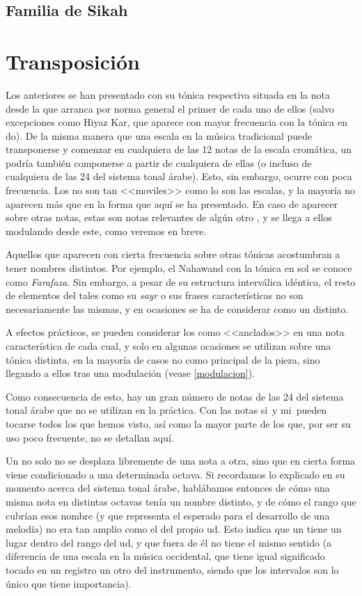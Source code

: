 \subsection{Familia de \yins Sikah}

\section{Transposición}
\label{transposicion}

Los anteriores \maqamaat se han presentado con su tónica respectiva situada en la nota desde la que arranca por norma general el primer \yins de cada uno de ellos (salvo excepciones como Hiyaz Kar, que aparece con mayor frecuencia con la tónica en do). De la misma manera que una escala en la música tradicional puede transponerse y comenzar en cualquiera de las 12 notas de la escala cromática, un \maqam podría también componerse a partir de cualquiera de ellas (o incluso de cualquiera de las 24 del sistema tonal árabe). Esto, sin embargo, ocurre con poca frecuencia. Los \maqamaat no son tan <<moviles>> como lo son las escalas, y la mayoría no aparecen más que en la forma que aquí se ha presentado. En caso de aparecer sobre otras notas, estas son notas relevantes de algún otro \maqamb, y se llega a ellos modulando desde este, como veremos en breve.

Aquellos \maqamaat que aparecen con cierta frecuencia sobre otras tónicas acostumbran a tener nombres distintos. Por ejemplo, el \maqam Nahawand con la tónica en sol se conoce como \emph{Farafaza}. Sin embargo, a pesar de su estructura interválica idéntica, el resto de elementos del \maqam tales como su \emph{sayr} o sus frases características no son necesariamente las mismas, y en ocasiones se ha de considerar como un \maqam distinto.

A efectos prácticos, se pueden considerar los \maqamaat como <<anclados>> en una nota característica de cada cual, y solo en algunas ocasiones se utilizan sobre una tónica distinta, en la mayoría de casos no como \maqam principal de la pieza, sino llegando a ellos tras una modulación (vease \ref{modulacion}).

Como consecuencia de esto, hay un gran número de notas de las 24 del sistema tonal árabe que no se utilizan en la práctica. Con las notas si\hflat\ y mi\hflat\ pueden tocarse todos los \maqamaat que hemos visto, así como la mayor parte de los que, por ser su uso poco frecuente, no se detallan aquí.

Un \maqam no solo no se desplaza libremente de una nota a otra, sino que en cierta forma viene condicionado a una determinada octava. Si recordamos lo explicado en su momento acerca del sistema tonal árabe, hablábamos entonces de cómo una misma nota en distintas octavas tenía un nombre distinto, y de cómo el rango que cubrían esos nombre (y que representa el esperado para el desarrollo de una melodía) no era tan amplio como el del propio ud. Esto indica que un \maqam tiene un lugar dentro del rango del ud, y que fuera de él no tiene el mismo sentido (a diferencia de una escala en la música occidental, que tiene igual significado tocado en un registro un otro del instrumento, siendo que los intervalos son lo único que tiene importancia).

